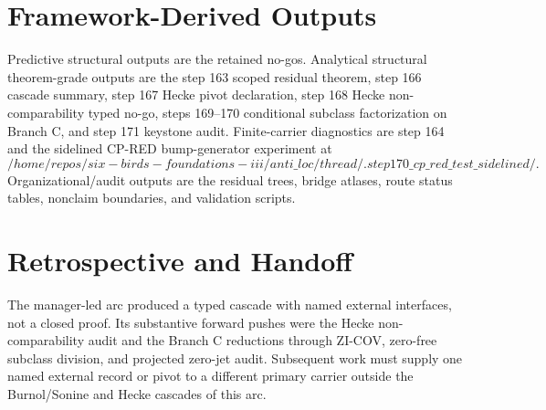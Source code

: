 \documentclass[11pt]{article}
\begin{document}
\section{Framework-Derived Outputs}

Predictive structural outputs are the retained no-gos. Analytical structural theorem-grade outputs are the step 163 scoped residual theorem, step 166 cascade summary, step 167 Hecke pivot declaration, step 168 Hecke non-comparability typed no-go, steps 169--170 conditional subclass factorization on Branch C, and step 171 keystone audit. Finite-carrier diagnostics are step 164 and the sidelined CP-RED bump-generator experiment at
\[
/home/repos/six-birds-foundations-iii/anti\_loc/thread/.step170\_cp\_red\_test\_sidelined/.
\]
Organizational/audit outputs are the residual trees, bridge atlases, route status tables, nonclaim boundaries, and validation scripts.

\section{Retrospective and Handoff}

The manager-led arc produced a typed cascade with named external interfaces, not a closed proof. Its substantive forward pushes were the Hecke non-comparability audit and the Branch C reductions through ZI-COV, zero-free subclass division, and projected zero-jet audit. Subsequent work must supply one named external record or pivot to a different primary carrier outside the Burnol/Sonine and Hecke cascades of this arc.
\end{document}
